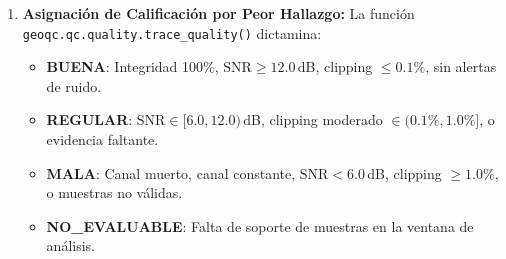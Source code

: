 \documentclass[11pt,a4paper]{article}
\begin{document}
\begin{enumerate}
    \begin{equation}
        \text{SNR}_{\text{dB}} = 10 \log_{10} \left( \frac{P_{\text{señal}}}{P_{\text{ruido}} + \epsilon} \right)
    \end{equation}
    \item \textbf{Asignación de Calificación por Peor Hallazgo:}
    La función \texttt{geoqc.qc.quality.trace\_quality()} dictamina:
    \begin{itemize}
        \item \textcolor{usablegreen}{\textbf{BUENA}}: Integridad 100\%, $\text{SNR} \ge 12.0$\,dB, clipping $\le 0.1\%$, sin alertas de ruido.
        \item \textcolor{reviewamber}{\textbf{REGULAR}}: $\text{SNR} \in [6.0, 12.0)$\,dB, clipping moderado $\in (0.1\%, 1.0\%]$, o evidencia faltante.
        \item \textcolor{badred}{\textbf{MALA}}: Canal muerto, canal constante, $\text{SNR} < 6.0$\,dB, clipping $\ge 1.0\%$, o muestras no válidas.
        \item \textcolor{unusablegrey}{\textbf{NO\_EVALUABLE}}: Falta de soporte de muestras en la ventana de análisis.
    \end{itemize}
\end{enumerate}
\end{document}
